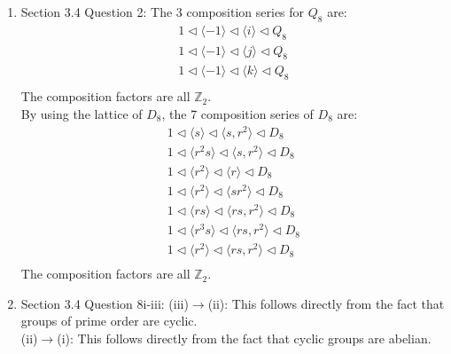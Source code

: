 \documentclass{article}
\begin{document}
\begin{enumerate}
  \item Section 3.4 Question 2: The 3 composition series for $Q_8$ are:
    \begin{align*}
      1 \triangleleft \langle-1\rangle \triangleleft \langle i\rangle
      \triangleleft Q_8 \\
      1 \triangleleft \langle-1\rangle \triangleleft \langle j\rangle
      \triangleleft Q_8 \\
      1 \triangleleft \langle-1\rangle \triangleleft \langle k\rangle
      \triangleleft Q_8 \\
    \end{align*}
    The composition factors are all $\mathbb{Z}_2$. \\

    By using the lattice of $D_8$, the 7 composition series of $D_8$ are:
    \begin{align*}
      1 \triangleleft \langle s\rangle
        \triangleleft \langle s,r^2\rangle
        \triangleleft D_8 \\
      1 \triangleleft \langle r^2s\rangle
        \triangleleft \langle s,r^2\rangle
        \triangleleft D_8 \\
      1 \triangleleft \langle r^2\rangle
        \triangleleft \langle r\rangle
        \triangleleft D_8 \\
      1 \triangleleft \langle r^2\rangle
        \triangleleft \langle sr^2\rangle
        \triangleleft D_8 \\
      1 \triangleleft \langle rs\rangle
        \triangleleft \langle rs,r^2\rangle
        \triangleleft D_8 \\
      1 \triangleleft \langle r^3s\rangle
        \triangleleft \langle rs,r^2\rangle
        \triangleleft D_8 \\
      1 \triangleleft \langle r^2\rangle
        \triangleleft \langle rs,r^2\rangle
        \triangleleft D_8 \\
    \end{align*}
    The composition factors are all $\mathbb{Z}_2$.

  \item Section 3.4 Question 8i-iii: (iii)$\rightarrow$(ii): This follows
    directly from the fact that groups of prime order are cyclic. \\

    (ii)$\rightarrow$(i): This follows directly from the fact that cyclic
    groups are abelian. \\


\end{enumerate}
\end{document}
